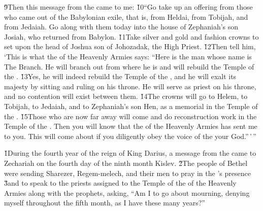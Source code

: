 \v{9}Then this message from the  came to me: \v{10}``Go take up an offering from those who came out of the Babylonian exile, that is, from Heldai, from Tobijah, and from Jedaiah. Go along with them today into the house of Zephaniah's son Josiah, who returned from Babylon. \v{11}Take silver and gold and fashion crowns to set upon the head of Joshua son of Johozadak, the High Priest. \v{12}Then tell him, `This is what the  of the Heavenly Armies says: ``Here is the man whose name is The Branch. He will branch out from where he is and will rebuild the Temple of the . \v{13}Yes, he will indeed rebuild the Temple of the , and he will exalt its majesty by sitting and ruling on his throne. He will serve as priest on his throne, and no contention will exist between them. \v{14}The crowns will go to Helem, to Tobijah, to Jedaiah, and to Zephaniah's son Hen, as a memorial in the Temple of the . \v{15}Those who are now far away will come and do reconstruction work in the Temple of the . Then you will know that the  of the Heavenly Armies has sent me to you. This will come about if you diligently obey the voice of the  your God.''\,'\,''

\v{1}During the fourth year of the reign of King Darius, a message from the  came to Zechariah on the fourth day of the ninth month Kislev. \v{2}The people of Bethel were sending Sharezer, Regem-melech, and their men to pray in the 's presence \v{3}and to speak to the priests assigned to the Temple of the  of the Heavenly Armies along with the prophets, asking, ``Am I to go about mourning, denying myself throughout the fifth month, as I have these many years?''

